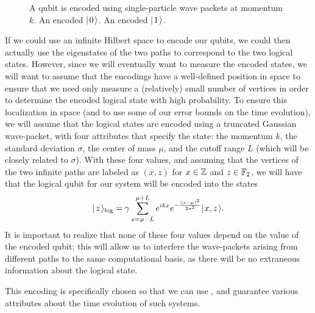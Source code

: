 \documentclass[../thesis-main/thesis-main]{subfiles}
\begin{document}

\begin{figure}
  \centering
  \qquad
  \caption[Quantum walk qubit encoding]{A qubit is encoded using single-particle wave packets at momentum $k$.   An encoded $|\mspace{2mu} 0 \mspace{2mu} \rangle$.   An encoded $|\mspace{2mu} 1 \mspace{2mu} \rangle$.}
  \label{fig:wavetrain_encoding}
\end{figure}

If we could use an infinite Hilbert space to encode our qubits, we could then actually use the eigenstates of the two paths to correspond to the two logical states.  However, since we will eventually want to measure the encoded states, we will want to assume that the encodings have a well-defined position in space to ensure that we need only measure a (relatively) small number of vertices in order to determine the encoded logical state with high probability.  To ensure this localization in space (and to use some of our error bounds on the time evolution), we will assume that the logical states are encoded using a truncated Gaussian wave-packet, with four attributes that specify the state: the momentum $k$, the standard deviation $\sigma$, the center of mass $\mu$, and the cutoff range $L$ (which will be closely related to $\sigma$).  With these four values, and assuming that the vertices of the two infinite paths are labeled as $(x,z)$ for $x\in \mathbb{Z}$ and $z\in \mathbb{F}_2$, we will have that the logical qubit for our system will be encoded into the states
\begin{align}
  |\mspace{2mu} z \mspace{2mu} \rangle_{\text{log}} = \gamma \sum_{x = \mu - L}^{\mu + L} e^{ i k x} e^{ - \frac{(x-\mu)^2}{2\sigma^2}} |\mspace{2mu} x,z \mspace{2mu} \rangle \label{eq:single_qubit_encoding}.
\end{align}
It is important to realize that none of these four values depend on the value of the encoded qubit; this will allow us to interfere the wave-packets arising from different paths to the same computational basis, as there will be no extraneous information about the logical state.

This encoding is specifically chosen so that we can use , and guarantee various attributes about the time evolution of such systems.
\end{document}
